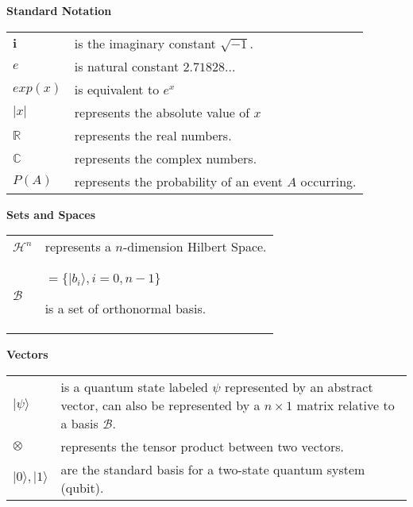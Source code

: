 


\listofsymbols






\textbf{Standard Notation}

\renewcommand*{\arraystretch}{1.4}
\begin{longtable}[l]{p{50pt} p{300pt}} 

$\mathbf{i}$
&
 is the imaginary constant $\sqrt{-1}$.
\\
$e$ 
&
is natural constant $2.71828...$
\\
$exp(x)$
&
 is equivalent to $e^{x}$
\\
$\vert x \vert $
&
 represents the absolute value of $x$
\\
$\mathbb{R}$ 
&
represents the real numbers.
\\
$\mathbb{C}$ 
&
represents the complex numbers.
\\
$P(A)$ 
& 
represents the probability of an event $A$ occurring.
\\
\end{longtable}
\textbf{Sets and Spaces}

\renewcommand*{\arraystretch}{1.4}
\begin{longtable}[l]{p{50pt} p{300pt}}

$\mathcal{H}^{n}$ 
&
represents a $n$-dimension Hilbert Space.
\\
$\mathcal{B}$ & $= \{ \vert b_{i} \rangle, i=0, n-1\}$

 is a set of orthonormal basis.
\\
\end{longtable}

\textbf{Vectors}

\renewcommand*{\arraystretch}{1.4}
\begin{longtable}[l]{p{50pt} p{300pt}}

$\vert \psi \rangle$
&
 is a quantum state labeled $\psi$ represented by an abstract vector, can also be represented by a $n \times 1$ matrix relative to a basis $\mathcal{B}$.
\\
$\otimes$
&
 represents the tensor product between two vectors.
\\
$ \vert 0 \rangle , \vert 1 \rangle$
&
 are the standard basis for a two-state quantum system (qubit).
\\
\end{longtable}


